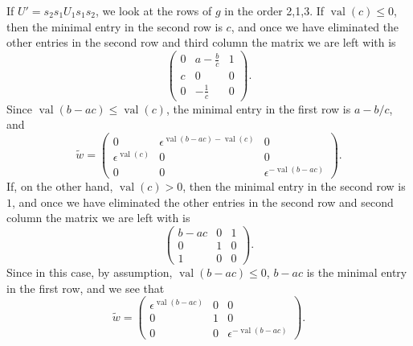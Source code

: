 \documentclass{amsart}
\theoremstyle{definition}
\def\e{\epsilon}
\def\w{\widetilde{w}}
\def\val{\mathop{\mathrm{val}}}
\begin{document}
  If $U' = s_2s_1 U_1 s_1s_2$, we look at the rows of $g$ in the order 2,1,3.
  If $\val(c) \le 0$, then the minimal entry in the second row is $c$, and once
  we have eliminated the other entries in the second row and third column the
  matrix we are left with is
  \begin{equation*}\begin{pmatrix}
      0 & a - \frac{b}{c} & 1 \\
      c & 0 & 0 \\
      0 & -\frac{1}{c} & 0
    \end{pmatrix}.
  \end{equation*}
  Since $\val(b-ac) \le \val(c)$, the minimal entry in the first row is $a -
  b/c$, and
  \begin{equation*}
    \w = \begin{pmatrix}
      0 & \e^{\val(b-ac) - \val(c)} & 0 \\
      \e^{\val(c)} & 0 & 0 \\
      0 & 0 & \e^{-\val(b-ac)}
    \end{pmatrix}.
  \end{equation*}
  If, on the other hand, $\val(c) > 0$, then the minimal entry in the second
  row is $1$, and once we have eliminated the other entries in the second row
  and second column the matrix we are left with is
  \begin{equation*}\begin{pmatrix}
      b-ac & 0 & 1 \\
      0 & 1 & 0 \\
      1 & 0 & 0
    \end{pmatrix}.
  \end{equation*}
  Since in this case, by assumption, $\val(b-ac) \le 0$, $b-ac$ is the minimal
  entry in the first row, and we see that
  \begin{equation*}\w = \begin{pmatrix}
      \e^{\val(b-ac)}  & 0 & 0\\
      0 & 1 & 0 \\
      0 & 0 & \e^{-\val(b-ac)} 
    \end{pmatrix}.
  \end{equation*}
\end{document}
